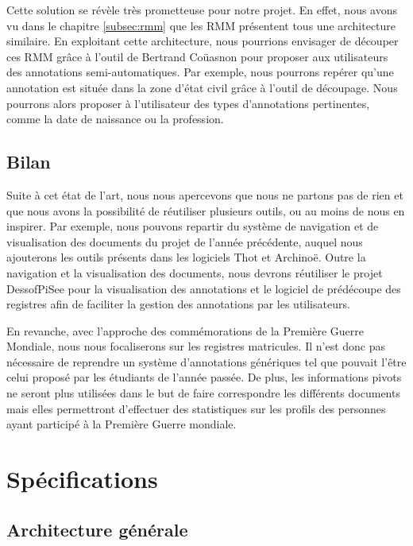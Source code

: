 \documentclass[a4paper]{article}
\begin{document}
	Cette solution se r\'ev\`ele tr\`es prometteuse pour notre projet. En effet, nous avons vu dans le chapitre \ref{subsec:rmm} que les RMM pr\'esentent tous une architecture similaire. En exploitant cette architecture, nous pourrions envisager de d\'ecouper ces RMM gr\^ace \`a l'outil de Bertrand Co\"uasnon pour proposer aux utilisateurs des annotations semi-automatiques. Par exemple, nous pourrons rep\'erer qu'une annotation est situ\'ee dans la zone d'\'etat civil gr\^ace \`a l'outil de d\'ecoupage. Nous pourrons alors proposer \`a l'utilisateur des types d'annotations pertinentes, comme la date de naissance ou la profession.

\subsection{Bilan}
\label{subsec:bilanetatart}

	Suite \`a cet \'etat de l'art, nous nous apercevons que nous ne partons pas de rien et que nous avons la possibilit\'e de r\'eutiliser plusieurs outils, ou au moins de nous en inspirer. Par  exemple, nous pouvons repartir du syst\`eme de navigation et de visualisation des documents du projet de l'ann\'ee pr\'ec\'edente, auquel nous ajouterons les outils pr\'esents dans les logiciels Thot et Archino\"e. Outre la navigation et la visualisation des documents, nous devrons r\'eutiliser le projet DessofPiSee pour la visualisation des annotations et le logiciel de pr\'ed\'ecoupe des registres afin de faciliter la gestion des annotations par les utilisateurs.

	En revanche, avec l'approche des comm\'emorations de la Premi\`ere Guerre Mondiale, nous nous focaliserons sur les registres matricules. Il n'est donc pas n\'ecessaire de reprendre un syst\`eme d'annotations g\'en\'eriques tel que pouvait l'\^etre celui propos\'e par les \'etudiants de l'ann\'ee pass\'ee. De plus, les informations pivots ne seront plus utilis\'ees dans le but de faire correspondre les diff\'erents documents mais elles permettront d'effectuer des statistiques sur les profils des personnes ayant particip\'e \`a la Premi\`ere Guerre mondiale.

\section{Sp\'ecifications}
\label{sec:spec}

\subsection{Architecture g\'en\'erale}
\label{subsec:archigenerale}
\end{document}
